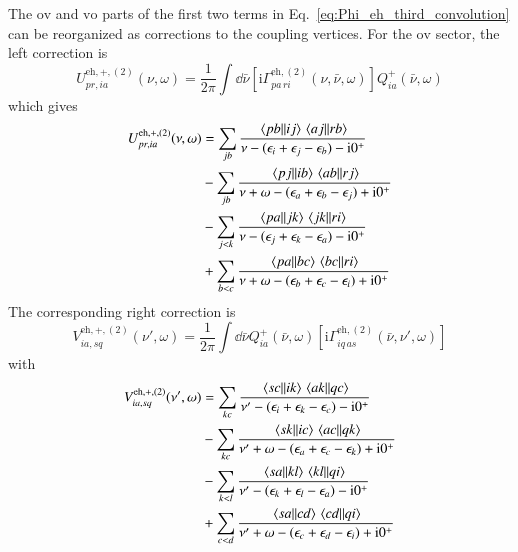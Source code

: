 \documentclass[aip,jcp,reprint,noshowkeys,superscriptaddress]{revtex4-1}
\newcommand{\eps}{\epsilon}
\newcommand{\ii}{\mathrm{i}}
\newcommand{\eh}{\text{eh}}
\begin{document}
The $\text{ov}$ and $\text{vo}$ parts of the first two terms in
Eq.~\eqref{eq:Phi_eh_third_convolution} can be reorganized as corrections to
the coupling vertices.
For the $\text{ov}$ sector, the left correction is
\begin{equation}
    U^{\eh,+,(2)}_{pr,ia}(\nu,\omega)
    =
    \frac{1}{2\pi}
    \int\dd{\bar\nu}
    \left[
    \ii\Gamma^{\eh,(2)}_{pa\,ri}(\nu,\bar\nu,\omega)
    \right]
    Q^+_{ia}(\bar\nu,\omega)
    \label{eq:U_eh_second_def}
\end{equation}
which gives
\begin{equation}
    \begin{split}
    U^{\eh,+,(2)}_{pr,ia}(\nu,\omega)
    & =
    \sum_{jb}
    \frac{\mel{pb}{}{ij}\mel{aj}{}{rb}}
    {\nu-(\eps_i+\eps_j-\eps_b)-\ii0^+}
    \\
    &-
    \sum_{jb}
    \frac{\mel{pj}{}{ib}\mel{ab}{}{rj}}
    {\nu+\omega-(\eps_a+\eps_b-\eps_j)+\ii0^+}
    \\
    &-
    \sum_{j<k}
    \frac{\mel{pa}{}{jk}\mel{jk}{}{ri}}
    {\nu-(\eps_j+\eps_k-\eps_a)-\ii0^+}
    \\
    &+
    \sum_{b<c}
    \frac{\mel{pa}{}{bc}\mel{bc}{}{ri}}
    {\nu+\omega-(\eps_b+\eps_c-\eps_i)+\ii0^+}
    \end{split}
    \label{eq:U_eh_second_explicit}
\end{equation}
The corresponding right correction is
\begin{equation}
    V^{\eh,+,(2)}_{ia,sq}(\nu',\omega)
    =
    \frac{1}{2\pi}
    \int\dd{\bar\nu}
    Q^+_{ia}(\bar\nu,\omega)
    \left[
    \ii\Gamma^{\eh,(2)}_{iq\,as}(\bar\nu,\nu',\omega)
    \right]
    \label{eq:V_eh_second_def}
\end{equation}
with
\begin{equation}
    \begin{split}
    V^{\eh,+,(2)}_{ia,sq}(\nu',\omega)
    & =
    \sum_{kc}
    \frac{\mel{sc}{}{ik}\mel{ak}{}{qc}}
    {\nu'-(\eps_i+\eps_k-\eps_c)-\ii0^+}
    \\
    &-
    \sum_{kc}
    \frac{\mel{sk}{}{ic}\mel{ac}{}{qk}}
    {\nu'+\omega-(\eps_a+\eps_c-\eps_k)+\ii0^+}
    \\
    &-
    \sum_{k<l}
    \frac{\mel{sa}{}{kl}\mel{kl}{}{qi}}
    {\nu'-(\eps_k+\eps_l-\eps_a)-\ii0^+}
    \\
    &+
    \sum_{c<d}
    \frac{\mel{sa}{}{cd}\mel{cd}{}{qi}}
    {\nu'+\omega-(\eps_c+\eps_d-\eps_i)+\ii0^+}
    \end{split}
    \label{eq:V_eh_second_explicit}
\end{equation}
\end{document}
